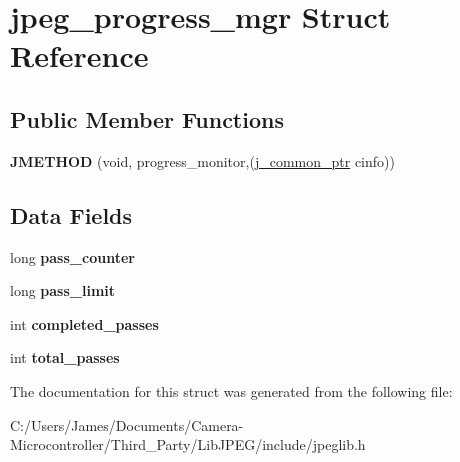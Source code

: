 \hypertarget{structjpeg__progress__mgr}{}\section{jpeg\+\_\+progress\+\_\+mgr Struct Reference}
\label{structjpeg__progress__mgr}
\subsection*{Public Member Functions}
\begin{DoxyCompactItemize}
\item 
\mbox{\label{structjpeg__progress__mgr_a4ba20923d7942bb46d5a0edf31ef09c8}} 
{\bfseries J\+M\+E\+T\+H\+OD} (void, progress\+\_\+monitor,(\hyperlink{structjpeg__common__struct}{j\+\_\+common\+\_\+ptr} cinfo))
\end{DoxyCompactItemize}
\subsection*{Data Fields}
\begin{DoxyCompactItemize}
\item 
\mbox{\label{structjpeg__progress__mgr_ad549be50780ef0cdd9edd6e223e95ba0}} 
long {\bfseries pass\+\_\+counter}
\item 
\mbox{\label{structjpeg__progress__mgr_ab2275aad0bbf912ae17536eb1cc8d346}} 
long {\bfseries pass\+\_\+limit}
\item 
\mbox{\label{structjpeg__progress__mgr_a2c563cc1c4834072b114d69f091ca062}} 
int {\bfseries completed\+\_\+passes}
\item 
\mbox{\label{structjpeg__progress__mgr_aba790bf96f4426d51ad59fe8325a1c38}} 
int {\bfseries total\+\_\+passes}
\end{DoxyCompactItemize}


The documentation for this struct was generated from the following file\+:\begin{DoxyCompactItemize}
\item 
C\+:/\+Users/\+James/\+Documents/\+Camera-\/\+Microcontroller/\+Third\+\_\+\+Party/\+Lib\+J\+P\+E\+G/include/jpeglib.\+h\end{DoxyCompactItemize}
